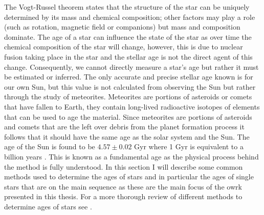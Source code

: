 The Vogt-Russel theorem states that the structure of the star can be uniquely determined by its mass and chemical composition; other factors may play a role (such as rotation, magnetic field or companions) but mass and composition dominate. The age of a star can influence the state of the star as over time the chemical composition of the star will change, however, this is due to nuclear fusion taking place in the star and the stellar age is not the direct agent of this change. Consequently, we cannot directly measure a star's age but rather it must be estimated or inferred. The only accurate and precise stellar age known is for our own Sun, but this value is not calculated from observing the Sun but rather through the study of meteorites. Meteorites are portions of asteroids or comets that have fallen to Earth, they contain long-lived radioactive isotopes of elements that can be used to age the material. Since meteorites are portions of asteroids and comets that are the left over debris from the planet formation process it follows that it should have the same age as the solar system and the Sun. The age of the Sun is found to be $4.57 \pm 0.02$ Gyr  where 1 Gyr is equivalent to a billion years \citep{Bahcall_etal_1995}. This is known as a fundamental age as the physical process behind the method is fully understood. In this section I will describe some common methods used to determine the ages of stars and in particular the ages of single stars that are on the main sequence as these are the main focus of the owrk presented in this thesis. For a more thorough review of different methods to determine ages of stars see \citet{Soderblom_2010}.

